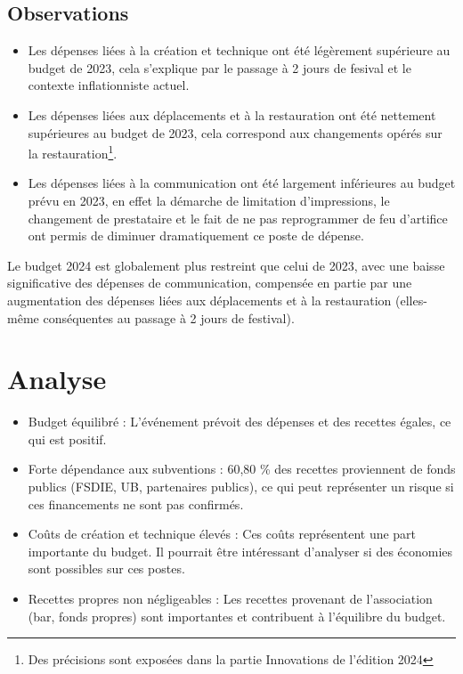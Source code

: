 \documentclass[12pt,a4paper]{report}
\begin{document}
\subsection{Observations}
\begin{itemize}
\item Les dépenses liées à la création et technique ont été légèrement supérieure au budget de 2023, cela s'explique par le passage à 2 jours de fesival et le contexte inflationniste actuel.
\item Les dépenses liées aux déplacements et à la restauration ont été nettement supérieures au budget de 2023, cela correspond aux changements opérés sur la restauration\footnote{Des précisions sont exposées dans la partie \og Innovations de l'édition 2024 \fg{}}.
\item Les dépenses liées à la communication ont été largement inférieures au budget prévu en 2023, en effet la démarche de limitation d'impressions, le changement de prestataire et le fait de ne pas reprogrammer de feu d'artifice ont permis de diminuer dramatiquement ce poste de dépense.\\
\end{itemize}

Le budget 2024 est globalement plus restreint que celui de 2023, avec une baisse significative des dépenses de communication, compensée en partie par une augmentation des dépenses liées aux déplacements et à la restauration (elles-même conséquentes au passage à 2 jours de festival).

\section{Analyse}
\begin{itemize}
\item Budget équilibré : L'événement prévoit des dépenses et des recettes égales, ce qui est positif.
\item Forte dépendance aux subventions : 60,80 \% des recettes proviennent de fonds publics (FSDIE, UB, partenaires publics), ce qui peut représenter un risque si ces financements ne sont pas confirmés.
\item Coûts de création et technique élevés : Ces coûts représentent une part importante du budget. Il pourrait être intéressant d'analyser si des économies sont possibles sur ces postes.
\item Recettes propres non négligeables : Les recettes provenant de l'association (bar, fonds propres) sont importantes et contribuent à l'équilibre du budget.
\end{itemize}
\end{document}
